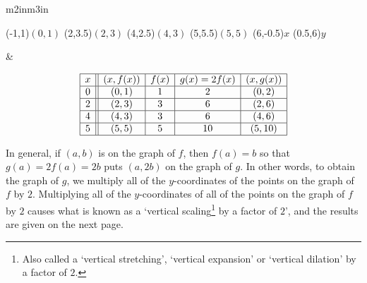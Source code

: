 \begin{center}

\begin{tabular}{m{2in}m{3in}}

\begin{mfpic}[15]{-1}{6}{-1}{6}
\tlabel[cc](-1,1){\scriptsize $(0,1)$}
\tlabel[cc](2,3.5){\scriptsize $(2,3)$}
\tlabel[cc](4,2.5){\scriptsize $(4,3)$}
\tlabel[cc](5,5.5){\scriptsize $(5,5)$}
\tlabel[cc](6,-0.5){\scriptsize $x$}
\tlabel[cc](0.5,6){\scriptsize $y$}
\axes
{}
\tlpointsep{4pt}
\end{mfpic}
 
&

\[ \begin{array}{|c||c|c|c|c|}  

\hline

 x & (x,f(x)) & f(x) & g(x)=2f(x) & (x, g(x)) \\ \hline
0  & (0,1)& 1 & 2 &(0, 2) \\  \hline
2 & (2,3) & 3 &  6 &(2,6) \\  \hline
4 & (4,3) & 3 &  6 &(4, 6) \\  \hline
5 & (5,5) & 5 &  10 &( 5 ,10) \\  \hline

\end{array} \] 

\end{tabular}

\end{center}

\vspace{-.3in}

In general, if $(a,b)$ is on the graph of $f$, then $f(a) = b$ so that $g(a) = 2 f(a) = 2b$ puts $(a,2b)$ on the graph of $g$.  In other words, to obtain the graph of $g$, we multiply all of the $y$-coordinates of the points on the graph of $f$ by $2$.  Multiplying all of the $y$-coordinates of all of the points on the graph of $f$ by $2$ causes what is known as a `vertical scaling\footnote{Also called a `vertical stretching', `vertical expansion' or `vertical dilation' by a factor of $2$.} by a factor of $2$', and the results are given on the next page. 

